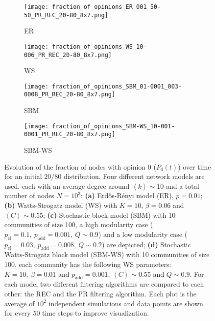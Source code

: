 \documentclass[11 pt , letterpaper , twoside , openright]{book}
\begin{document}
\begin{figure}[H]
  \begin{subfigure}[b]{0.49\textwidth}
  	\texttt{[image: fraction\_of\_opinions\_ER\_001\_50-50\_PR\_REC\_20-80\_8x7.png]}
    \caption{ER}
  \end{subfigure}
  \begin{subfigure}[b]{0.49\textwidth}
  	\texttt{[image: fraction\_of\_opinions\_WS\_10-006\_PR\_REC\_20-80\_8x7.png]}
    \caption{WS}
    \label{ws_20-80_op}
  \end{subfigure}
  \begin{subfigure}[b]{0.49\textwidth}
    \texttt{[image: fraction\_of\_opinions\_SBM\_01-0001\_003-0008\_PR\_REC\_20-80\_8x7.png]}
    \caption{SBM}
  \end{subfigure}
  \begin{subfigure}[b]{0.49\textwidth}
    \texttt{[image: fraction\_of\_opinions\_SBM-WS\_10-001-0001\_PR\_REC\_20-80\_8x7.png]}
    \caption{SBM-WS}
    \label{sbm-ws_20-80_op}
  \end{subfigure}
  \captionsetup{format=plain}
  \caption[Evolution of the fraction of nodes with opinion 0 ($P_0(t)$) over time for an initial $20/80$ opinion distribution.]{Evolution of the fraction of nodes with opinion 0 ($P_0(t)$) over time for an initial $20/80$ distribution. Four different network models are used, each with an average degree around $\left<k\right> \sim 10$ and a total number of nodes $N = 10^3$: \textbf{(a)} Erd\H{o}s-R\'{e}nyi model (ER), $p=0.01$; \textbf{(b)} Watts-Strogatz model (WS) with $K = 10$, $\beta = 0.06$ and $\left<C\right> \sim 0.55$; \textbf{(c)} Stochastic block model (SBM) with 10 communities of size 100, a high modularity case ($p_{\text{cl}} = 0.1,\ p_{\text{add}} = 0.001,\ Q \sim 0.9$) and a low modularity case ($p_{\text{cl}} = 0.03,\ p_{\text{add}} = 0.008,\ Q \sim 0.2$) are depicted; \textbf{(d)} Stochastic Watts-Strogatz block model (SBM-WS) with 10 communities of size 100, each community has the following WS parameters: $K = 10,\ \beta = 0.01$ and $p_{\text{add}} = 0.001$, $\left<C\right> \sim 0.55$ and $Q \sim 0.9$. For each model two different filtering algorithms are compared to each other: the REC and the PR filtering algorithm. Each plot is the average of $10^2$ independent simulations and data points are shown for every 50 time steps to improve visualization.}
\label{ev_op_20_80}
\end{figure}
\end{document}
